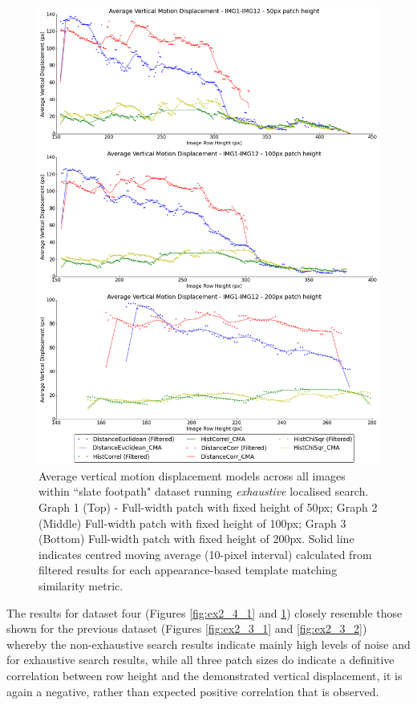 \clearpage
\begin{figure}[ht!]
\centering
\includegraphics[scale=0.3]{images/results/path_outside_10cm_non_scaled_exhaustive}
\caption{Average vertical motion displacement models across all images within ``slate footpath" dataset running \textit{exhaustive} localised search. Graph 1 (Top) - Full-width patch with fixed height of 50px; Graph 2 (Middle) Full-width patch with fixed height of 100px; Graph 3 (Bottom) Full-width patch with fixed height of 200px. Solid line indicates centred moving average (10-pixel interval) calculated from filtered results for each appearance-based template matching similarity metric.}
\label{fig:ex2_4_2}
\end{figure}


The results for dataset four (Figures \ref{fig:ex2_4_1} and \ref{fig:ex2_4_2}) closely resemble those shown for the previous dataset (Figures \ref{fig:ex2_3_1} and \ref{fig:ex2_3_2}) whereby the non-exhaustive search results indicate mainly high levels of noise and for exhaustive search results, while all three patch sizes do indicate a definitive correlation between row height and the demonstrated vertical displacement, it is again a negative, rather than expected positive correlation that is observed. 


